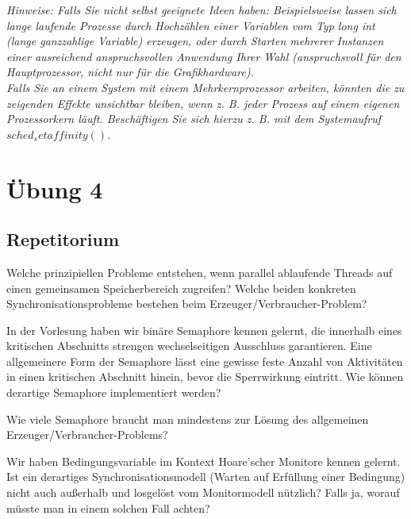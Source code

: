 \documentclass[a4paper]{article}
\begin{document}
\textit{
    Hinweise:
    Falls Sie nicht selbst geeignete Ideen haben: Beispielsweise lassen sich lange laufende Prozesse durch Hochzählen einer Variablen vom Typ long int (lange ganzzahlige Variable) erzeugen, oder durch Starten mehrerer Instanzen einer ausreichend anspruchsvollen Anwendung Ihrer Wahl (anspruchsvoll für den Hauptprozessor, nicht nur für die Grafikhardware).\\
    Falls Sie an einem System mit einem Mehrkernprozessor arbeiten, könnten die zu zeigenden Effekte unsichtbar bleiben, wenn z. B. jeder Prozess auf einem eigenen Prozessorkern läuft. Beschäftigen Sie sich hierzu z. B. mit dem Systemaufruf $sched_setaffinity()$.
}
\vspace{10mm}


\newpage
\section{Übung 4}
\subsection{Repetitorium}
\begin{description*}
    \item[Welche prinzipiellen Probleme entstehen, wenn parallel ablaufende Threads auf einen gemeinsamen Speicherbereich zugreifen? Welche beiden konkreten Synchronisationsprobleme bestehen beim Erzeuger/Verbraucher-Problem?]
    \item[In der Vorlesung haben wir binäre Semaphore kennen gelernt, die innerhalb eines kritischen Abschnitts strengen wechselseitigen Ausschluss garantieren. Eine allgemeinere Form der Semaphore lässt eine gewisse feste Anzahl von Aktivitäten in einen kritischen Abschnitt hinein, bevor die Sperrwirkung eintritt. Wie können derartige Semaphore implementiert werden?]
    \item[Wie viele Semaphore braucht man mindestens zur Lösung des allgemeinen Erzeuger/Verbraucher-Problems?]
    \item[Wir haben Bedingungsvariable im Kontext Hoare’scher Monitore kennen gelernt. Ist ein derartiges Synchronisationsmodell (Warten auf Erfüllung einer Bedingung) nicht auch außerhalb und losgelöst vom Monitormodell nützlich? Falls ja, worauf müsste man in einem solchen Fall achten?]
\end{description*}
\end{document}
